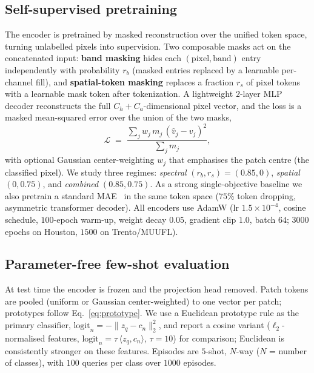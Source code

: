 \subsection{Self-supervised pretraining}
\label{subsec:pretrain}
The encoder is pretrained by masked reconstruction over the unified token space,
turning unlabelled pixels into supervision. Two composable masks act on the
concatenated input: \textbf{band masking} hides each $(\text{pixel},\text{band})$
entry independently with probability $r_b$ (masked entries replaced by a learnable
per-channel fill), and \textbf{spatial-token masking} replaces a fraction $r_s$ of
pixel tokens with a learnable mask token after tokenization. A lightweight $2$-layer
MLP decoder reconstructs the full $C_h{+}C_a$-dimensional pixel vector, and the loss
is a masked mean-squared error over the union of the two masks,
\begin{equation}
  \mathcal{L} \;=\; \frac{\sum_j w_j\, m_j\, (\hat v_j - v_j)^2}{\sum_j m_j},
  \label{eq:recon}
\end{equation}
with optional Gaussian center-weighting $w_j$ that emphasises the patch centre (the
classified pixel). We study three regimes: \emph{spectral} $(r_b,r_s){=}(0.85,0)$,
\emph{spatial} $(0,0.75)$, and \emph{combined} $(0.85,0.75)$. As a strong
single-objective baseline we also pretrain a standard MAE~\cite{he2022mae} in the
same token space ($75\%$ token dropping, asymmetric transformer decoder). All
encoders use AdamW (lr $1.5{\times}10^{-4}$, cosine schedule, $100$-epoch warm-up,
weight decay $0.05$, gradient clip $1.0$, batch $64$; $3000$ epochs on Houston,
$1500$ on Trento/MUUFL).

\subsection{Parameter-free few-shot evaluation}
\label{subsec:eval}
At test time the encoder is frozen and the projection head removed. Patch tokens are
pooled (uniform or Gaussian center-weighted) to one vector per patch; prototypes
follow Eq.~\eqref{eq:prototype}. We use a Euclidean prototype rule as the primary
classifier, $\text{logit}_n = -\lVert z_q - c_n\rVert_2^2$, and report a cosine
variant ($\ell_2$-normalised features, $\text{logit}_n = \tau\,\langle z_q,c_n\rangle$,
$\tau{=}10$) for comparison; Euclidean is consistently stronger on these features.
Episodes are $5$-shot, $N$-way ($N$ = number of classes), with $100$ queries per
class over $1000$ episodes.

